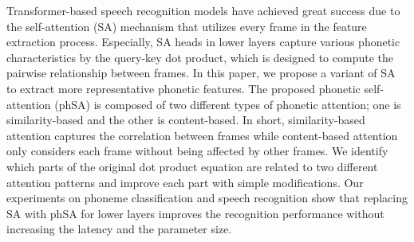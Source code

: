 Transformer-based speech recognition models have achieved great success due to the self-attention (SA) mechanism that utilizes every frame in the feature extraction process.
Especially, SA heads in lower layers capture various phonetic characteristics by the query-key dot product, which is designed to compute the pairwise relationship between frames.
In this paper, we propose a variant of SA to extract more representative phonetic features.
The proposed phonetic self-attention (phSA) is composed of two different types of phonetic attention; one is similarity-based and the other is content-based.
In short, similarity-based attention captures the correlation between frames while content-based attention only considers each frame without being affected by other frames.
We identify which parts of the original dot product equation are related to two different attention patterns and improve each part with simple modifications.
Our experiments on phoneme classification and speech recognition show that replacing SA with phSA for lower layers improves the recognition performance without increasing the latency and the parameter size.
